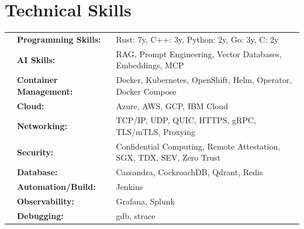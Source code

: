 \documentclass[12pt,a4paper]{article}
\begin{document}
\section*{Technical Skills}
\vspace{-0.1cm}
\begin{tabular}{L{0.1cm} L{5cm} l}
&\textbf{Programming Skills:}      & Rust: 7y, C++: 3y, Python: 2y, Go: 3y, C: 2y \\
&\textbf{AI Skills:}              & RAG, Prompt Engineering, Vector Databases, Embeddings, MCP \\
&\textbf{Container Management:}  & Docker, Kubernetes, OpenShift, Helm, Operator, Docker Compose\\
&\textbf{Cloud:}                 & Azure, AWS, GCP, IBM Cloud\\
&\textbf{Networking:}            & TCP/IP, UDP, QUIC, HTTPS, gRPC, TLS/mTLS, Proxying\\
&\textbf{Security:}              & Confidential Computing, Remote Attestation, SGX, TDX, SEV, Zero Trust\\
&\textbf{Database:}              & Cassandra, CockroachDB, Qdrant, Redis\\
&\textbf{Automation/Build:}      & Jenkins\\
&\textbf{Observability:} & Grafana, Splunk\\
&\textbf{Debugging:}             & gdb, strace\\
\end{tabular}

\vspace{-0.4cm}
\end{document}
